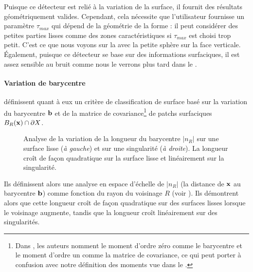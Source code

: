 Puisque ce détecteur est relié à la variation de la surface, il fournit des
résultats géométriquement valides. Cependant, cela nécessite que l'utilisateur
fournisse un paramètre $\tau_{max}$ qui dépend de la géométrie de la forme : il
peut considérer des petites parties lisses comme des zones caractéristiques si
$\tau_{max}$ est choisi trop petit. C'est ce que nous voyons sur la
 avec la petite sphère sur la face verticale.
Également, puisque ce détecteur se base sur des informations surfaciques, il est
assez sensible au bruit comme nous le verrons plus tard dans le
.
%
\paragraph{Variation de barycentre}
%
 définissent quant à eux un critère de
classification de surface basé sur la variation du barycentre $\mathbf{b}$ et de la
matrice de covariance\footnote{Dans \cite{Telea2004}, les auteurs nomment le
moment d'ordre zéro comme le barycentre et le moment d'ordre un comme la matrice
de covariance, ce qui peut porter à confusion avec notre définition des moments
vue dans le .} de patchs surfaciques
$B_{R}(\mathbf{x}) \cap \partial X$.

\begin{figure}[ht]
  \begin{center}
    
  \end{center}
  \caption[Analyse de la variation de longueur du barycentre.]
  {Analyse de la variation de la longueur du barycentre $|n_R|$ sur une surface
  lisse (\emph{à gauche}) et sur une singularité (\emph{à droite}). La longueur
  croît de façon quadratique sur la surface lisse et linéairement sur la
  singularité.\label{fig:moments-explained}}
\end{figure}


Ils définissent alors une analyse en espace d'échelle de $|n_R|$ (la distance de
$\mathbf{x}$ au barycentre $\mathbf{b}$) comme fonction du rayon du voisinage $R$ (voir
). Ils démontrent alors que cette longueur
croît de façon quadratique sur des surfaces lisses lorsque le voisinage
augmente, tandis que la longueur croît linéairement sur des singularités.

